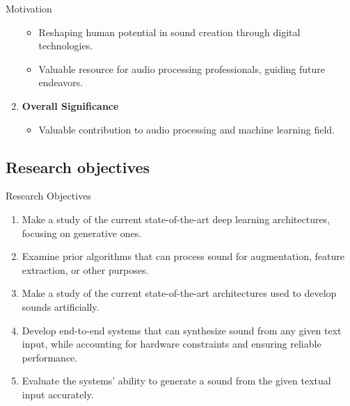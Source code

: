 \begin{frame}{Motivation}
\begin{enumerate}
\begin{itemize}
                  \item Reshaping human potential in sound creation through digital technologies.
                  \item Valuable resource for audio processing professionals, guiding future endeavors.
              \end{itemize}
        \item \textbf{Overall Significance}
              \begin{itemize}
                  \item Valuable contribution to audio processing and machine learning field.
              \end{itemize}
    \end{enumerate}
\end{frame}

\subsection{Research objectives}

\begin{frame}{Research Objectives}
    \begin{enumerate}
        \item Make a study of the current state-of-the-art deep learning architectures, focusing on generative ones.
        \item Examine prior algorithms that can process sound for augmentation, feature extraction, or other purposes.
        \item Make a study of the current state-of-the-art architectures used to develop sounds artificially.
        \item Develop end-to-end systems that can synthesize sound from any given text input, while accounting for hardware constraints and ensuring reliable performance.
        \item Evaluate the systems’ ability to generate a sound from the given textual input accurately.
    \end{enumerate}
\end{frame}